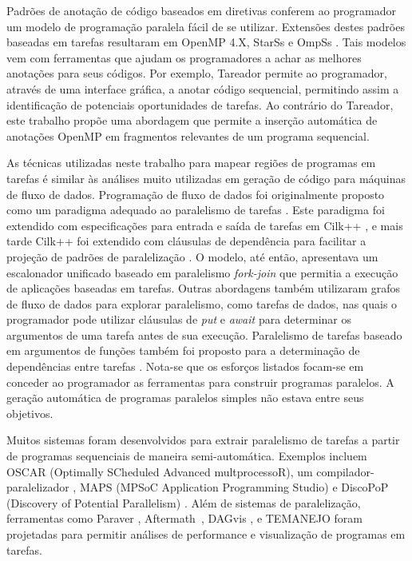 \documentclass[sigconf]{acmart}
\begin{document}
Padrões de anotação de código baseados em diretivas conferem ao programador um modelo de programação paralela fácil de se utilizar. Extensões destes padrões baseadas em tarefas resultaram em  OpenMP 4.X,
StarSs \cite{planas:hpca:2009,
tejedor:hpdc:2011} e OmpSs \cite{bueno:icpp:2011}. Tais modelos vem com ferramentas que ajudam os programadores a achar as melhores anotações para seus códigos. Por exemplo, Tareador \cite{Ayguade15} permite ao programador, através de uma interface gráfica, a anotar código sequencial, permitindo assim a identificação de potenciais oportunidades de tarefas. Ao contrário do Tareador, este trabalho propõe uma abordagem que permite a inserção automática de anotações OpenMP em fragmentos relevantes de um programa sequencial.

As técnicas utilizadas neste trabalho para mapear regiões de programas em tarefas é similar às análises muito utilizadas em geração de código para máquinas de fluxo de dados. Programação de fluxo de dados foi originalmente proposto como um paradigma adequado ao paralelismo de tarefas \cite{agrawal:ipdps:2010,
gupta:micro:2011}. Este paradigma foi extendido com especificações para entrada e saída de tarefas em Cilk++ \cite{agrawal:ipdps:2010}, e mais tarde Cilk++ foi extendido com cláusulas de dependência para facilitar a projeção de padrões de paralelização \cite{vandierendonck:hotpar:2011}. O modelo, até então, apresentava um escalonador unificado baseado em paralelismo {\em fork-join} que permitia a execução de aplicações baseadas em tarefas. Outras abordagens também utilizaram grafos de fluxo de dados para explorar paralelismo, como tarefas de dados, nas quais o programador pode utilizar cláusulas de \textit{put} e \textit{await} para determinar os argumentos de uma tarefa antes de sua execução. Paralelismo de tarefas baseado em argumentos de funções também foi proposto para a determinação de dependências entre tarefas \cite{gupta:micro:2011}. Nota-se que os esforços listados focam-se em conceder ao programador as ferramentas para construir programas paralelos. A geração automática de programas paralelos simples não estava entre seus objetivos.

Muitos sistemas foram desenvolvidos para extrair paralelismo de tarefas a partir de programas sequenciais de maneira semi-automática. Exemplos incluem OSCAR (Optimally SCheduled Advanced multprocessoR), um compilador-paralelizador \cite{ishizaka:journal:2000}, MAPS (MPSoC Application Programming Studio) \cite{castrillon:tii:2013} e DiscoPoP (Discovery of Potential Parallelism) \cite{li:jss:2016}. Além de sistemas de paralelização, ferramentas como Paraver  \cite{paraver}, Aftermath~\cite{drebes:hipeac:2014}, DAGvis \cite{huynh:wvpa:2015}, e TEMANEJO
\cite{temanejo} foram projetadas para permitir análises de performance e visualização de programas em tarefas. 
\end{document}
